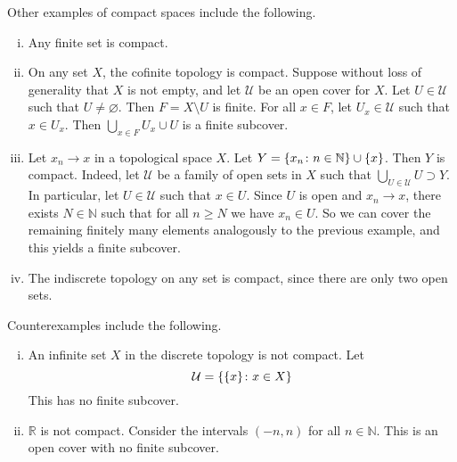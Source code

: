 \begin{example}
	Other examples of compact spaces include the following.
	\begin{enumerate}[(i)]
		\item Any finite set is compact.
		\item On any set \( X \), the cofinite topology is compact.
		      Suppose without loss of generality that \( X \) is not empty, and let \( \mathcal U \) be an open cover for \( X \).
		      Let \( U \in \mathcal U \) such that \( U \neq \varnothing \).
		      Then \( F = X \setminus U \) is finite.
		      For all \( x \in F \), let \( U_x \in \mathcal U \) such that \( x \in U_x \).
		      Then \( \bigcup_{x \in F} U_x \cup U \) is a finite subcover.
		\item Let \( x_n \to x \) in a topological space \( X \).
		      Let \( Y = \qty{x_n \colon n \in \mathbb N} \cup \qty{x} \).
		      Then \( Y \) is compact.
		      Indeed, let \( \mathcal U \) be a family of open sets in \( X \) such that \( \bigcup_{U \in \mathcal U} U \supset Y \).
		      In particular, let \( U \in \mathcal U \) such that \( x \in U \).
		      Since \( U \) is open and \( x_n \to x \), there exists \( N \in \mathbb N \) such that for all \( n \geq N \) we have \( x_n \in U \).
		      So we can cover the remaining finitely many elements analogously to the previous example, and this yields a finite subcover.
		\item The indiscrete topology on any set is compact, since there are only two open sets.
	\end{enumerate}
	Counterexamples include the following.
	\begin{enumerate}[(i)]
		\item An infinite set \( X \) in the discrete topology is not compact.
		      Let
		      \[
			      \mathcal U = \qty{\qty{x} \colon x \in X}
		      \]
		      This has no finite subcover.
		\item \( \mathbb R \) is not compact.
		      Consider the intervals \( (-n, n) \) for all \( n \in \mathbb N \).
		      This is an open cover with no finite subcover.
	\end{enumerate}
\end{example}

